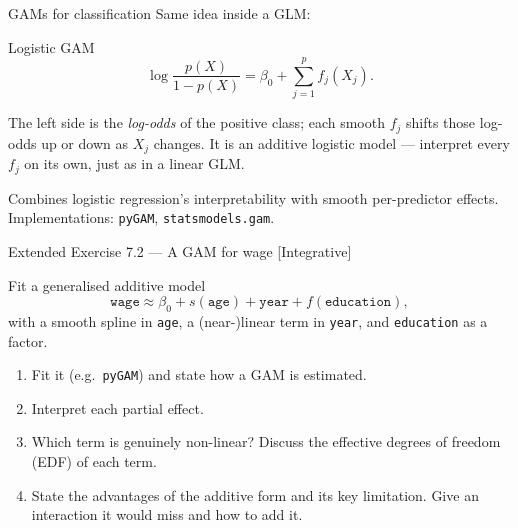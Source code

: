 \documentclass[aspectratio=169,11pt]{beamer}
\begin{document}
\begin{frame}{GAMs for classification}
  Same idea inside a GLM:
  \begin{block}{Logistic GAM}
    \[
      \log\frac{p(X)}{1 - p(X)} = \beta_0 + \sum_{j=1}^p f_j(X_j).
    \]
  \end{block}
  \begin{readme}
    The left side is the \emph{log-odds} of the positive class; each
    smooth $f_j$ shifts those log-odds up or down as $X_j$ changes. It
    is an additive logistic model --- interpret every $f_j$ on its own,
    just as in a linear GLM.
  \end{readme}
  Combines logistic regression's interpretability with smooth
  per-predictor effects. Implementations: \texttt{pyGAM},
  \texttt{statsmodels.gam}.
\end{frame}

\begin{frame}{Extended Exercise 7.2 --- A GAM for wage [Integrative]}
\begin{longexercise}
Fit a generalised additive model
\[ \mathtt{wage} \approx \beta_0 + s(\mathtt{age}) + \mathtt{year} + f(\mathtt{education}), \]
with a smooth spline in \texttt{age}, a (near-)linear term in \texttt{year}, and \texttt{education} as a factor.
\begin{enumerate}
  \item Fit it (e.g.\ \texttt{pyGAM}) and state how a GAM is estimated.
  \item Interpret each partial effect.
  \item Which term is genuinely non-linear? Discuss the effective degrees of freedom (EDF) of each term.
  \item State the advantages of the additive form and its key limitation. Give an interaction it would miss and how to add it.
\end{enumerate}
\end{longexercise}
\end{frame}
\end{document}
